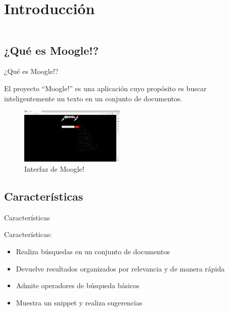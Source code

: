 \section{Introducción}\label{intro}

\begin{frame}
    \begin{columns}[t]
        \begin{column}{.5\textwidth}
          \tableofcontents[sections={1-2},currentsection]
        \end{column}
        \begin{column}{.5\textwidth}
          \tableofcontents[sections={3-4},currentsection]
        \end{column}
    \end{columns}
\end{frame}

\subsection{¿Qué es Moogle!?}
\begin{frame}{¿Qué es Moogle!?}
\begin{center}
El proyecto “Moogle!” es una aplicación cuyo propósito es buscar inteligentemente un texto en un conjunto de documentos. 

\begin{figure}[h]
    \center
    \includegraphics[width=5cm]{interfaz.png}
    \caption{Interfaz de Moogle!}
\end{figure}

\end{center}

\end{frame}


\subsection{Características}
\begin{frame}{Características}

Características:
\begin{itemize}
  \item Realiza búsquedas en un conjunto de documentos
  \item Devuelve resultados organizados por relevancia y de manera rápida
  \item Admite operadores de búsqueda básicos
  \item Muestra un snippet y realiza sugerencias
\end{itemize}

\end{frame}



